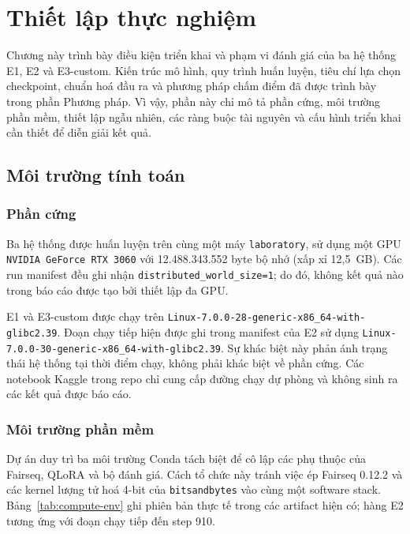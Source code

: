 \section{Thiết lập thực nghiệm}

Chương này trình bày điều kiện triển khai và phạm vi đánh giá của ba hệ thống
E1, E2 và E3-custom. Kiến trúc mô hình, quy trình huấn luyện, tiêu chí lựa chọn
checkpoint, chuẩn hoá đầu ra và phương pháp chấm điểm đã được trình bày trong
phần Phương pháp. Vì vậy, phần này chỉ mô tả phần cứng, môi trường phần mềm,
thiết lập ngẫu nhiên, các ràng buộc tài nguyên và cấu hình triển khai cần thiết
để diễn giải kết quả.

\subsection{Môi trường tính toán}

\subsubsection{Phần cứng}

Ba hệ thống được huấn luyện trên cùng một máy \texttt{laboratory}, sử dụng một
GPU \texttt{NVIDIA GeForce RTX 3060} với 12.488.343.552 byte bộ nhớ (xấp xỉ
12,5~GB). Các run manifest đều ghi nhận
\texttt{distributed\_world\_size=1}; do đó, không kết quả nào trong báo cáo
được tạo bởi thiết lập đa GPU.

E1 và E3-custom được chạy trên
\texttt{Linux-7.0.0-28-generic-x86\_64-with-glibc2.39}. Đoạn chạy tiếp hiện được
ghi trong manifest của E2 sử dụng
\texttt{Linux-7.0.0-30-generic-x86\_64-with-glibc2.39}. Sự khác biệt này phản
ánh trạng thái hệ thống tại thời điểm chạy, không phải khác biệt về phần cứng.
Các notebook Kaggle trong repo chỉ cung cấp đường chạy dự phòng và không sinh
ra các kết quả được báo cáo.

\subsubsection{Môi trường phần mềm}

Dự án duy trì ba môi trường Conda tách biệt để cô lập các phụ thuộc của
Fairseq, QLoRA và bộ đánh giá. Cách tổ chức này tránh việc ép Fairseq 0.12.2 và
các kernel lượng tử hoá 4-bit của \texttt{bitsandbytes} vào cùng một software
stack. Bảng~\ref{tab:compute-env} ghi phiên bản thực tế trong các artifact hiện
có; hàng E2 tương ứng với đoạn chạy tiếp đến step 910.

